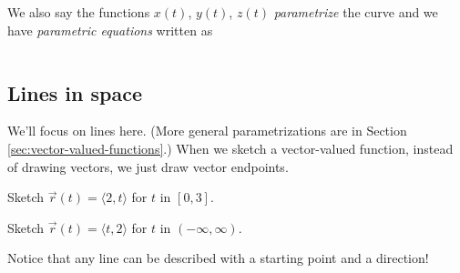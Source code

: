 We also say the functions $x(t)$, $y(t)$, $z(t)$ \emph{parametrize} the curve and we have \emph{parametric equations} written as 
\[
    \phantom{x=x(t),\quad y=y(t),\quad z=z(t).}
\]

\pagebreak 

\subsection{Lines in space}
We'll focus on lines here. (More general parametrizations are in Section \ref{sec:vector-valued-functions}.) When we sketch a vector-valued function, instead of drawing vectors, we just draw vector endpoints.

\begin{ex}
    Sketch $\vec{r}(t)=\langle 2,t\rangle$ for $t$ in $[0,3]$.
\end{ex}

\vfill 

\begin{ex}
    Sketch $\vec{r}(t)=\langle t,2\rangle$ for $t$ in $(-\infty,\infty)$.
\end{ex}

\vfill

\noindent Notice that any line can be described with a starting point and a direction!
\medskip

